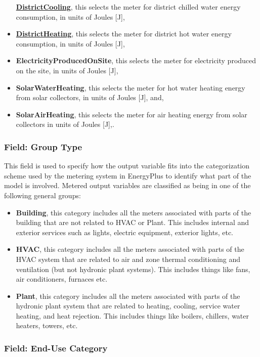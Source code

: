 \begin{itemize}
  \textbf{\hyperref[districtcooling]{DistrictCooling}}, this selects the meter for district chilled water energy consumption, in units of Joules {[}J{]},
\item
  \textbf{\hyperref[districtheating]{DistrictHeating}}, this selects the meter for district hot water energy consumption, in units of Joules {[}J{]},
\item
  \textbf{ElectricityProducedOnSite}, this selects the meter for electricity produced on the site, in units of Joules {[}J{]},
\item
  \textbf{SolarWaterHeating}, this selects the meter for hot water heating energy from solar collectors, in units of Joules {[}J{]}, and,
\item
  \textbf{SolarAirHeating}, this selects the meter for air heating energy from solar collectors in units of Joules {[}J{]},.
\end{itemize}

\subsubsection{Field: Group Type}\label{field-group-type}

This field is used to specify how the output variable fits into the categorization scheme used by the metering system in EnergyPlus to identify what part of the model is involved. Metered output variables are classified as being in one of the following general groups:

\begin{itemize}
\item
  \textbf{Building}, this category includes all the meters associated with parts of the building that are not related to HVAC or Plant. This includes internal and exterior services such as lights, electric equipment, exterior lights, etc.
\item
  \textbf{HVAC}, this category includes all the meters associated with parts of the HVAC system that are related to air and zone thermal conditioning and ventilation (but not hydronic plant systems). This includes things like fans, air conditioners, furnaces etc.
\item
  \textbf{Plant}, this category includes all the meters associated with parts of the hydronic plant system that are related to heating, cooling, service water heating, and heat rejection. This includes things like boilers, chillers, water heaters, towers, etc.
\end{itemize}

\subsubsection{Field: End-Use Category}\label{field-end-use-category}

